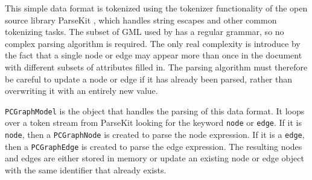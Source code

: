 
This simple data format is tokenized using the tokenizer functionality of the
open source library ParseKit \cite{parsekit}, which handles string escapes and
other common tokenizing tasks. The subset of GML used by \pathcasemaw has a
regular grammar, so no complex parsing algorithm is required.  The only real
complexity is introduce by the fact that a single node or edge may appear more
than once in the document with different subsets of attributes filled in. The
parsing algorithm must therefore be careful to update a node or edge if it has
already been parsed, rather than overwriting it with an entirely new value.

\texttt{PCGraphModel} is the object that handles the parsing of this data
format. It loops over a token stream from ParseKit looking for the keyword
\texttt{node} or \texttt{edge}. If it is \texttt{node}, then a
\texttt{PCGraphNode} is created to parse the node expression. If it is a
\texttt{edge}, then a \texttt{PCGraphEdge} is created to parse the edge
expression. The resulting nodes and edges are either stored in memory or update
an existing node or edge object with the same identifier that already exists.

